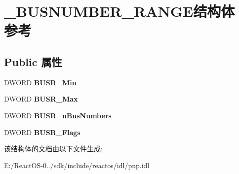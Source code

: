 \hypertarget{struct___b_u_s_n_u_m_b_e_r___r_a_n_g_e}{}\section{\+\_\+\+B\+U\+S\+N\+U\+M\+B\+E\+R\+\_\+\+R\+A\+N\+G\+E结构体 参考}
\label{struct___b_u_s_n_u_m_b_e_r___r_a_n_g_e}
\subsection*{Public 属性}
\begin{DoxyCompactItemize}
\item 
\mbox{\label{struct___b_u_s_n_u_m_b_e_r___r_a_n_g_e_a104da21a73a8a201dc5903ddefc7932a}} 
D\+W\+O\+RD {\bfseries B\+U\+S\+R\+\_\+\+Min}
\item 
\mbox{\label{struct___b_u_s_n_u_m_b_e_r___r_a_n_g_e_a03fee00c06d8a24e4eeaa83cdd107f02}} 
D\+W\+O\+RD {\bfseries B\+U\+S\+R\+\_\+\+Max}
\item 
\mbox{\label{struct___b_u_s_n_u_m_b_e_r___r_a_n_g_e_a89fc326dccd2cc2427ef2ec7d3ecca9b}} 
D\+W\+O\+RD {\bfseries B\+U\+S\+R\+\_\+n\+Bus\+Numbers}
\item 
\mbox{\label{struct___b_u_s_n_u_m_b_e_r___r_a_n_g_e_ad8ee85315c5b20b4a15f0665a2c3c980}} 
D\+W\+O\+RD {\bfseries B\+U\+S\+R\+\_\+\+Flags}
\end{DoxyCompactItemize}


该结构体的文档由以下文件生成\+:\begin{DoxyCompactItemize}
\item 
E\+:/\+React\+O\+S-\/0../sdk/include/reactos/idl/pnp.\+idl\end{DoxyCompactItemize}
